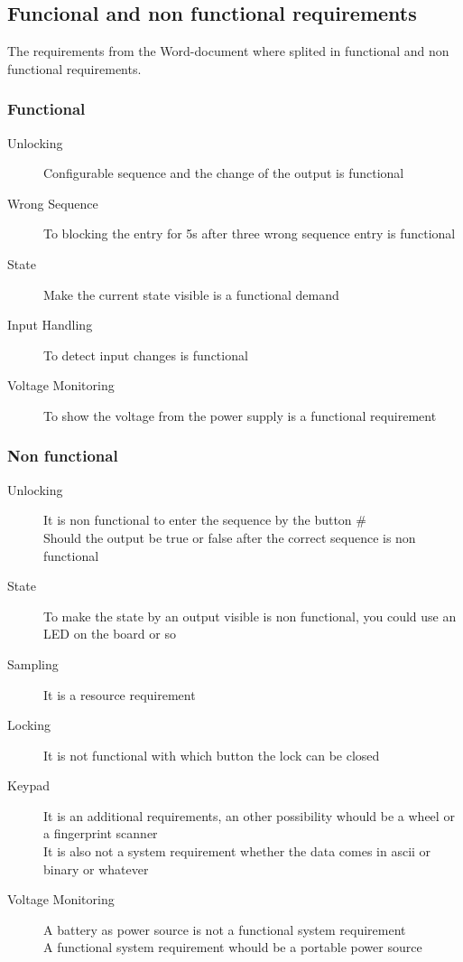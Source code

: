 	
	\subsection{Funcional and non functional requirements}\label{subsec:func}
	The requirements from the Word-document where splited in functional and non functional requirements.
		\subsubsection{Functional}
			\begin{description}
				\item [Unlocking] Configurable sequence and the change of the output is functional
				\item [Wrong Sequence] To blocking the entry for 5s after three wrong sequence entry is functional
				\item [State] Make the current state visible is a functional demand\\
				\item [Input Handling] To detect input changes is functional															
				\item [Voltage Monitoring] To show the voltage from the power supply is a functional requirement
			\end{description}
		\subsubsection{Non functional}
			\begin{description}
				\item [Unlocking] It is non functional to enter the sequence by the button \# \\
				Should the output be true or false after the correct sequence is non functional
				\item [State] To make the state by an output visible is non functional, you could use an LED on the board or so
				\item [Sampling] It is a resource requirement
				\item [Locking] It is not functional with which button the lock can be closed
				\item [Keypad] It is an additional requirements, an other possibility whould be a wheel or a fingerprint scanner\\
				It is also not a system requirement whether the data comes in ascii or binary or whatever
				\item [Voltage Monitoring] A battery as power source is not a functional system requirement\\
				A functional system requirement whould be a portable power source		
			\end{description}

